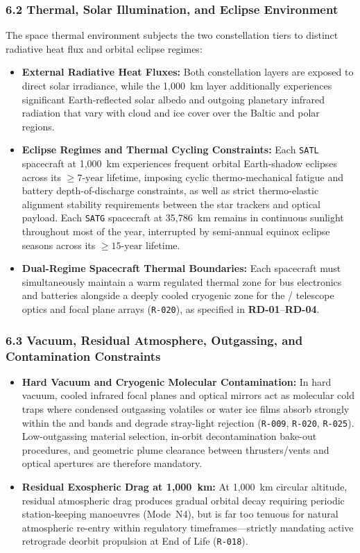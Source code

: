 \subsubsection{6.2 Thermal, Solar Illumination, and Eclipse Environment}

The space thermal environment subjects the two constellation tiers to distinct radiative heat flux and orbital eclipse regimes:
\begin{itemize}
    \item \textbf{External Radiative Heat Fluxes:} Both constellation layers are exposed to direct solar irradiance, while the 1,000~km  layer additionally experiences significant Earth-reflected solar albedo and outgoing planetary infrared radiation that vary with cloud and ice cover over the Baltic and polar regions.
    \item \textbf{Eclipse Regimes and Thermal Cycling Constraints:} Each \texttt{SATL} spacecraft at 1,000~km experiences frequent orbital Earth-shadow eclipses across its $\ge 7\text{-year}$ lifetime, imposing cyclic thermo-mechanical fatigue and battery depth-of-discharge constraints, as well as strict thermo-elastic alignment stability requirements between the star trackers and optical payload. Each \texttt{SATG} spacecraft at 35,786~km remains in continuous sunlight throughout most of the year, interrupted by semi-annual equinox eclipse seasons across its $\ge 15\text{-year}$ lifetime.
    \item \textbf{Dual-Regime Spacecraft Thermal Boundaries:} Each spacecraft must simultaneously maintain a warm regulated thermal zone for bus electronics and batteries alongside a deeply cooled cryogenic zone for the / telescope optics and focal plane arrays (\texttt{R-020}), as specified in \textbf{RD-01}--\textbf{RD-04}.
\end{itemize}

\subsubsection{6.3 Vacuum, Residual Atmosphere, Outgassing, and Contamination Constraints}

\begin{itemize}
    \item \textbf{Hard Vacuum and Cryogenic Molecular Contamination:} In hard vacuum, cooled infrared focal planes and optical mirrors act as molecular cold traps where condensed outgassing volatiles or water ice films absorb strongly within the  and  bands and degrade stray-light rejection (\texttt{R-009}, \texttt{R-020}, \texttt{R-025}). Low-outgassing material selection, in-orbit decontamination bake-out procedures, and geometric plume clearance between thrusters/vents and optical apertures are therefore mandatory.
    \item \textbf{Residual Exospheric Drag at 1,000~km:} At 1,000~km circular altitude, residual atmospheric drag produces gradual orbital decay requiring periodic station-keeping manoeuvres (Mode~N4), but is far too tenuous for natural atmospheric re-entry within regulatory timeframes---strictly mandating active retrograde deorbit propulsion at End of Life (\texttt{R-018}).
\end{itemize}


